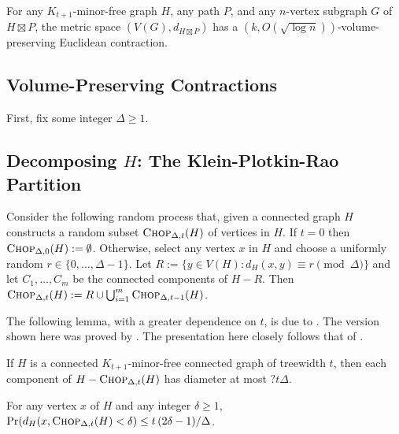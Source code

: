 \documentclass{patmorin}
\newcommand{\defin}[1]{\emph{\textcolor{brightmaroon}{#1}}}
\begin{document}
\begin{thm}
  For any $K_{t+1}$-minor-free graph $H$, any path $P$, and any $n$-vertex subgraph $G$ of $H\boxtimes P$, the metric space $(V(G),d_{H\boxtimes P})$ has a $(k,O(\sqrt{\log n}))$-volume-preserving Euclidean contraction.
\end{thm}



\subsection{Volume-Preserving Contractions}

First, fix some integer $\Delta \ge 1$.

\subsection{Decomposing $H$: The Klein-Plotkin-Rao Partition}

Consider the following random process that, given a connected graph $H$ constructs a random subset $\textsc{Chop}_{\Delta,t}(H)$ of vertices in $H$. If $t=0$ then $\textsc{Chop}_{\Delta,0}(H):=\emptyset$.  Otherwise, select any vertex $x$ in $H$ and choose a uniformly random $r\in\{0,\ldots,\Delta-1\}$.  Let $R:=\{y\in V(H):d_{H}(x,y)\equiv r\pmod{\Delta}\}$ and let $C_1,\ldots,C_m$ be the connected components of $H-R$.  Then $\textsc{Chop}_{\Delta,t}(H):=R\cup\bigcup_{i=1}^m \textsc{Chop}_{\Delta,t-1}(H)$.


The following lemma, with a greater dependence on $t$, is due to \citet{klein.plotkin.ea:excluded}. The version shown here was proved by \citet{fakcharoenphol.talwar:improved}. The presentation here closely follows that of \citet{lee:simpler}.

\begin{lem}\label{component_diameter_h}
  If $H$ is a connected $K_{t+1}$-minor-free connected graph of treewidth $t$, then each component of $H-\textsc{Chop}_{\Delta,t}(H)$ has diameter at most $?t\Delta$.
\end{lem}



\begin{lem}\label{delta_bad_h}
  For any vertex $x$ of $H$ and any integer $\delta\ge 1$, $\Pr(d_H(x, \textsc{Chop}_{\Delta,t}(H)< \delta)\le t\,(2\delta-1)/\Delta$.
\end{lem}
\end{document}
